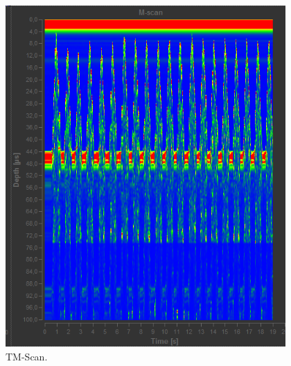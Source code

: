 \begin{figure}
  \centering
  \includegraphics[height=13cm]{Daten/TM-Scan.png}
  \caption{TM-Scan.}
  \label{fig:TMScan}
\end{figure}
